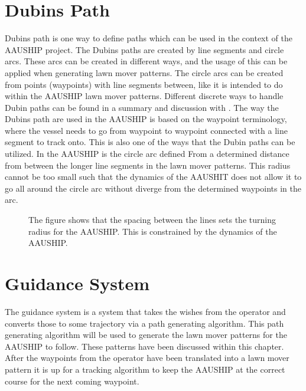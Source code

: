 \section{Dubins Path}
Dubins path is one way to define paths which can be used in the context of the AAUSHIP project. The Dubins paths are created by line segments and circle arcs. These arcs can be created in different ways, and the usage of this can be applied when generating lawn mover patterns. The circle arcs can be created from points (waypoints) with line segments between, like it is intended to do within the AAUSHIP lawn mover patterns. Different discrete ways to handle Dubin paths can be found in a summary and discussion with \citep{dubin}. The way the Dubins path are used in the AAUSHIP is based on the waypoint terminology, where the vessel needs to go from waypoint to waypoint connected with a line segment to track onto. This is also one of the ways that the Dubin paths can be utilized. In the AAUSHIP is the circle arc defined From a determined distance from between the longer line segments in the lawn mover patterns. This radius cannot be too small such that the dynamics of the AAUSHIT does not allow it to go all around the circle arc without diverge from the determined waypoints in the arc.
\begin{figure}[htbp]
	\centering
	
	\caption{The figure shows that the spacing between the lines sets the turning radius for the AAUSHIP. This is constrained by the dynamics of the AAUSHIP.}
	\label{fig:lawnmoverturn}
\end{figure}


 

\section{Guidance System}
The guidance system is a system that takes the wishes from the
operator and converts those to some trajectory via a path generating
algorithm. This path generating algorithm will be used to generate the lawn mover patterns for the AAUSHIP to follow. These patterns have been discussed within this chapter. After the waypoints from the operator have been translated into a lawn mover pattern it is up for a tracking algorithm to keep the AAUSHIP at the correct course for the next coming waypoint.

